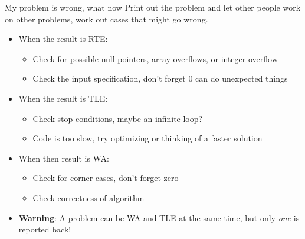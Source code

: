 \documentclass[11pt,pdf, aspectratio=169]{beamer}
\begin{document}
  \begin{frame}{My problem is wrong, what now}
    Print out the problem and let other people work on other problems, work out cases that might go wrong.
    \begin{itemize}
      \item When the result is RTE:
      \begin{itemize}
        \item Check for possible null pointers, array overflows, or integer overflow
        \item Check the input specification, don't forget 0 can do unexpected things
      \end{itemize}
      \item When the result is TLE:
      \begin{itemize}
        \item Check stop conditions, maybe an infinite loop?
        \item Code is too slow, try optimizing or thinking of a faster solution
      \end{itemize}
      \item When then result is WA:
      \begin{itemize}
        \item Check for corner cases, don't forget zero
        \item Check correctness of algorithm
      \end{itemize}
      \item \textbf{Warning}: A problem can be WA and TLE at the same time, but only \emph{one} is reported back!
    \end{itemize}
  \end{frame}
\end{document}
